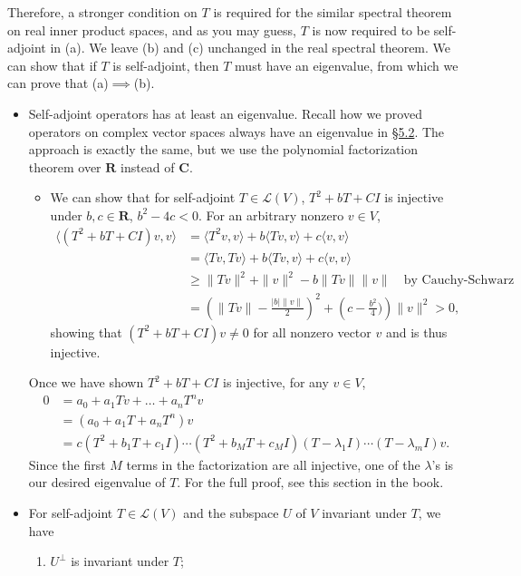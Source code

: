 \documentclass[11pt]{article}
\newcommand{\lk}[2]{\hyperlink{subsection.#1.#2}{\S#1.#2}}
\newcommand{\R}{\mathbf{R}}
\newcommand{\C}{\mathbf{C}}
\newcommand{\inp}[2]{\langle #1, #2 \rangle}
\newcommand{\nm}[1]{\|#1\|}
\newcommand{\abs}[1]{\lvert #1 \rvert}
\newcommand{\LV}{\mathcal{L}(V)}
\begin{document}
Therefore, a stronger condition on $T$ is required for the similar spectral theorem on real inner product spaces, and as you may guess, $T$ is now required to be self-adjoint in (a). We leave (b) and (c) unchanged in the real spectral theorem. We can show that if $T$ is self-adjoint, then $T$ must have an eigenvalue, from which we can prove that (a)$\implies$(b).
    \begin{itemize}
    \item Self-adjoint operators has at least an eigenvalue. Recall how we proved operators on complex vector spaces always have an eigenvalue in \lk{5}{2}. The approach is exactly the same, but we use the polynomial factorization theorem over $\R$ instead of $\C$.
    \begin{itemize}
        \item We can show that for self-adjoint $T \in \LV$, $T^2+bT+CI$ is injective under $b,c\in\R$, $b^2-4c<0$. For an arbitrary nonzero $v \in V$,
        \begin{align*}
            \inp{(T^2+bT+CI)v}{v} & = \inp{T^2v}{v}+b\inp{Tv}{v}+c\inp{v}{v} \\
            & = \inp{Tv}{Tv}+b\inp{Tv}{v}+c\inp{v}{v} \\
            & \geq \nm{Tv}^2+\nm{v}^2 -b\nm{Tv}\nm{v} \quad \text{by Cauchy-Schwarz}\\
            & = \left(\nm{Tv}-\frac{\abs{b}\nm{v}}{2}\right)^2 + \left(c - \frac{b^2}{4})\right)\nm{v}^2 > 0,
        \end{align*}
        showing that $(T^2+bT+CI)v \not= 0$ for all nonzero vector $v$ and is thus injective.
    \end{itemize}
    
    Once we have shown $T^2+bT+CI$ is injective, for any $v \in V$,
    \begin{align*}
        0 & = a_0+a_1Tv+\dots+a_nT^nv \\
        & = (a_0+a_1T+a_nT^n) v \\
        & = c(T^2+b_1T+c_1I)\cdots(T^2+b_MT+c_MI)(T-\lambda_1I)\cdots(T-\lambda_mI)v.
    \end{align*}
    Since the first $M$ terms in the factorization are all injective, one of the $\lambda$'s is our desired eigenvalue of $T$. For the full proof, see this section in the book.
    \item For self-adjoint $T \in \LV$ and the subspace $U$ of $V$ invariant under $T$, we have
    \begin{enumerate}[label=(\alph*)]
        \item $U^\perp$ is invariant under $T$;
        

\end{enumerate}
\end{itemize}
\end{document}
